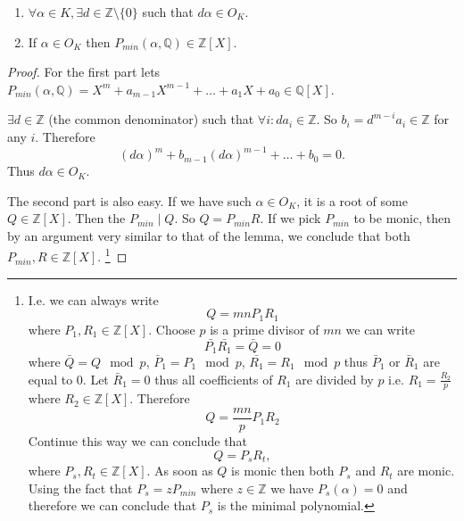 \begin{property}
  \begin{enumerate}
  \item $\forall \alpha \in K, \exists d \in \mathbb{Z} \setminus
    \{0\}$ such that $d\alpha \in O_K$.
  \item If $\alpha \in O_K$ then $P_{min}\left(\alpha,
    \mathbb{Q}\right) \in \mathbb{Z}\left[X\right]$.
  \end{enumerate}
  \begin{proof}
    For the first part lets
    $P_{min}\left(\alpha,
    \mathbb{Q}\right) = X^m + a_{m-1}X^{m-1} + \dots + a_1 X + a_0
    \in \mathbb{Q}\left[X\right]$.

    $\exists d \in \mathbb{Z}$ (the common denominator) such that
    $\forall i: d a_i \in \mathbb{Z}$. So
    $b_i = d^{m-i}a_i \in \mathbb{Z}$ for any $i$. Therefore
    \[
    \left(d \alpha\right)^m + b_{m-1} \left(d \alpha\right)^{m-1} +
    \dots + b_0 = 0.
    \]
    Thus $d \alpha \in O_K$.

    The second part is also easy. If we have such
    $\alpha \in O_K$, it is a
    root of some 
    $Q \in \mathbb{Z}\left[X\right]$.
    Then the $P_{min} \mid Q$. So $Q = P_{min} R$.
    If we pick $P_{min}$ to be monic, then by an
    argument very similar to that of the  lemma,
    we conclude  that both $P_{min}, R \in \mathbb{Z}\left[X\right]$.
    \footnote{
      I.e. we can always write
      \[
      Q = m n P_1 R_1 
      \]
      where $P_1, R_1 \in \mathbb{Z}\left[X\right]$. Choose $p$ is a
      prime divisor of $m n$ we can write
      \[
      \bar{P_1}\bar{R_1} = \bar{Q} = 0
      \]
      where $\bar{Q} = Q \mod p$, $\bar{P}_1 = P_1 \mod p$,
      $\bar{R_1} = R_1 \mod p$ thus $\bar{P}_1$ or $\bar{R}_1$ are
      equal to 0. Let $\bar{R}_1 = 0$ thus all coefficients of $R_1$ are
      divided by $p$ i.e. $R_1 = \frac{R_2}{p}$ where
      $R_2 \in \mathbb{Z}\left[X\right]$. Therefore
      \[
      Q = \frac{mn}{p}P_1 R_2
      \]
      Continue this way we can conclude that
      \[
      Q = P_s R_t, 
      \]
      where $P_s, R_t \in \mathbb{Z}\left[X\right]$. As soon as $Q$ is
      monic then both $P_s$ and $R_t$ are monic. Using the fact that
      $P_s = z P_{min}$ where $z \in \mathbb{Z}$ we have
      $P_s\left(\alpha\right) = 0$ and therefore we can
      conclude that $P_s$ is the minimal polynomial. 
    }
  \end{proof}
  \label{property:lec9_2}
\end{property}

